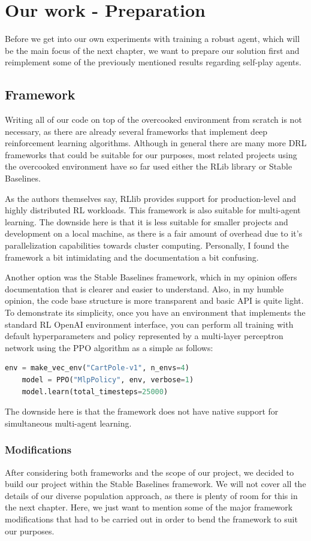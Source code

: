 \chapter{Our work - Preparation}
Before we get into our own experiments with training a robust agent, which will be the main focus of the next chapter, we want to prepare our solution first and reimplement some of the previously mentioned results regarding self-play agents.

\section{Framework}
Writing all of our code on top of the overcooked environment from scratch is not necessary, as there are already several frameworks that implement deep reinforcement learning algorithms.
Although in general there are many more DRL frameworks that could be suitable for our purposes, most related projects using the overcooked environment have so far used either the RLib library or Stable Baselines.

As the authors themselves say, RLlib provides support for production-level and highly distributed RL workloads.
This framework is also suitable for multi-agent learning.
The downside here is that it is less suitable for smaller projects and development on a local machine, as there is a fair amount of overhead due to it's parallelization capabilities towards cluster computing.
Personally, I found the framework a bit intimidating and the documentation a bit confusing.

Another option was the Stable Baselines framework, which in my opinion offers documentation that is clearer and easier to understand.
Also, in my humble opinion, the code base structure is more transparent and basic API is quite light.
To demonstrate its simplicity, once you have an environment that implements the standard RL OpenAI environment interface, you can perform all training with default hyperparameters and policy represented by a multi-layer perceptron network using the PPO algorithm as a simple as follows:
\begin{lstlisting}[language=Python]
    env = make_vec_env("CartPole-v1", n_envs=4)
    model = PPO("MlpPolicy", env, verbose=1)
    model.learn(total_timesteps=25000)

\end{lstlisting}
The downside here is that the framework does not have native support for simultaneous multi-agent learning.

\subsection{Modifications}
After considering both frameworks and the scope of our project, we decided to build our project within the Stable Baselines framework.
We will not cover all the details of our diverse population approach, as there is plenty of room for this in the next chapter.
Here, we just want to mention some of the major framework modifications that had to be carried out in order to bend the framework to suit our purposes.

